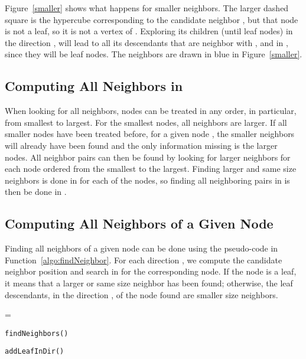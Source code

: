 \documentclass[letterpaper, 10 pt, conference]{ieeeconf}
\makeatletter
\theoremstyle{definition}
\newcounter{megaalgorithm}
\newenvironment{megaalgorithm}[1][htb]
  {\renewcommand{\algorithmcfname}{Function}\let\c@algocf\c@megaalgorithm \begin{algorithm}[#1]}{\end{algorithm}}
\makeatother
\begin{document}
Figure~\ref{smaller} shows what happens for smaller neighbors. The larger dashed square is the hypercube corresponding to the candidate neighbor , but that node is not a leaf, so it is not a vertex of . Exploring its children (until leaf nodes) in the direction , will lead to all its descendants that are neighbor with , and in , since they will be leaf nodes. The neighbors are drawn in blue in Figure~\ref{smaller}.

\subsection{Computing All Neighbors in \texorpdfstring{}{Gi}} \label{sec:allneigh}

When looking for all neighbors, nodes can be treated in any order, in particular, from smallest to largest. For the smallest nodes, all neighbors are larger. If all smaller nodes have been treated before, for a given node , the smaller neighbors will already have been found and the only information missing is the larger nodes.
All neighbor pairs can then be found by looking for larger neighbors for each node ordered from the smallest to the largest.
Finding larger and same size neighbors is done in   for each of the  nodes, so finding all neighboring pairs in  is then be done in .

\subsection{Computing All Neighbors of a Given Node \texorpdfstring{}{nkp}}

Finding all neighbors of a given node  can be done using the pseudo-code in Function~\ref{algo:findNeighbor}.
For each direction , we compute the candidate neighbor position  and search in  for the corresponding node.
If the node is a leaf, it means that a larger or same size neighbor has been found;
otherwise, the leaf descendants, in the direction , of the node found are smaller size neighbors.

\begin{megaalgorithm}[ht]
 =\;
 	\Return \;

 \caption{\tt findNeighbors()}
\label{algo:findNeighbor}
\end{megaalgorithm}

\begin{megaalgorithm}[ht]

 \caption{\tt addLeafInDir()}
\label{algo:addLeafInDir}
\end{megaalgorithm}
\end{document}
